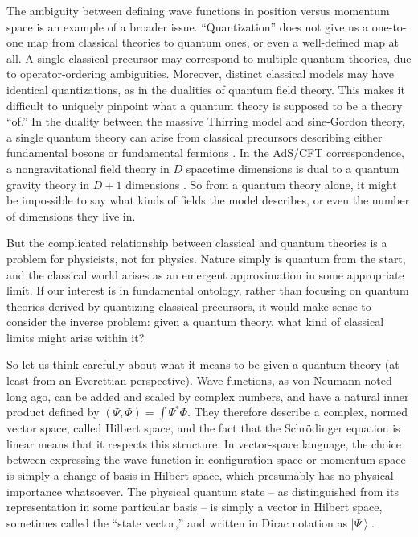 \documentclass[12pt,english]{article}
\newcommand{\ket}[1]{\left| #1 \right\rangle}
\begin{document}
The ambiguity between defining wave functions in position versus momentum space is an example of a broader issue.
``Quantization'' does not give us a one-to-one map from classical theories to quantum ones, or even a well-defined map at all.
A single classical precursor may correspond to multiple quantum theories, due to operator-ordering ambiguities.
Moreover, distinct classical models may have identical quantizations, as in the dualities of quantum field theory.
This makes it difficult to uniquely pinpoint what a quantum theory is supposed to be a theory ``of.''
In the duality between the massive Thirring model and sine-Gordon theory, a single quantum theory can arise from classical precursors describing either fundamental bosons or fundamental fermions \citep{PhysRevD.11.2088}.
In the AdS/CFT correspondence, a nongravitational field theory in $D$ spacetime dimensions is dual to a quantum gravity theory in $D+1$ dimensions \citep{Maldacena:1997re}.
So from a quantum theory alone, it might be impossible to say what kinds of fields the model describes, or even the number of dimensions they live in.

But the complicated relationship between classical and quantum theories is a problem for physicists, not for physics.
Nature simply is quantum from the start, and the classical world arises as an emergent approximation in some appropriate limit.
If our interest is in fundamental ontology, rather than focusing on quantum theories derived by quantizing classical precursors, it would make sense to consider the inverse problem: given a quantum theory, what kind of classical limits might arise within it?

So let us think carefully about what it means to be given a quantum theory (at least from an Everettian perspective).
Wave functions, as von Neumann noted long ago, can be added and scaled by complex numbers, and have a natural inner product defined by $(\Psi,\Phi) = \int \Psi^*\Phi$.
They therefore describe a complex, normed vector space, called Hilbert space, and the fact that the Schr\"odinger equation is linear means that it respects this structure.
In vector-space language, the choice between expressing the wave function in configuration space or momentum space is simply a change of basis in Hilbert space, which presumably has no physical importance whatsoever.
The physical quantum state -- as distinguished from its representation in some particular basis -- is simply a vector in Hilbert space, sometimes called the ``state vector,'' and written in Dirac notation as $\ket{\Psi}$.
\end{document}
